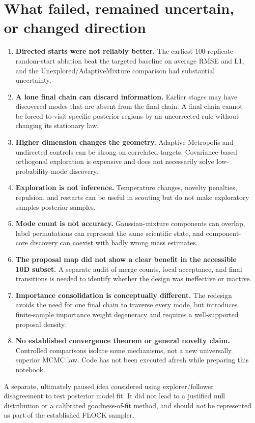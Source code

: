 \documentclass[11pt,letterpaper]{article}
\begin{document}
\section{What failed, remained uncertain, or changed direction}
\begin{enumerate}[leftmargin=*]
\item \textbf{Directed starts were not reliably better.} The earliest 100-replicate random-start ablation beat the targeted baseline on average RMSE and L1, and the Unexplored/AdaptiveMixture comparison had substantial uncertainty.
\item \textbf{A lone final chain can discard information.} Earlier stages may have discovered modes that are absent from the final chain. A final chain cannot be forced to visit specific posterior regions by an uncorrected rule without changing its stationary law.
\item \textbf{Higher dimension changes the geometry.} Adaptive Metropolis and undirected controls can be strong on correlated targets. Covariance-based orthogonal exploration is expensive and does not necessarily solve low-probability-mode discovery.
\item \textbf{Exploration is not inference.} Temperature changes, novelty penalties, repulsion, and restarts can be useful in scouting but do not make exploratory samples posterior samples.
\item \textbf{Mode count is not accuracy.} Gaussian-mixture components can overlap, label permutations can represent the same scientific state, and component-core discovery can coexist with badly wrong mass estimates.
\item \textbf{The proposal map did not show a clear benefit in the accessible 10D subset.} A separate audit of merge counts, local acceptance, and final transitions is needed to identify whether the design was ineffective or inactive.
\item \textbf{Importance consolidation is conceptually different.} The redesign avoids the need for one final chain to traverse every mode, but introduces finite-sample importance weight degeneracy and requires a well-supported proposal density.
\item \textbf{No established convergence theorem or general novelty claim.} Controlled comparisons isolate some mechanisms, not a new universally superior MCMC law. Code has not been executed afresh while preparing this notebook.
\end{enumerate}
A separate, ultimately paused idea considered using explorer/follower disagreement to test posterior model fit. It did not lead to a justified null distribution or a calibrated goodness-of-fit method, and should \emph{not} be represented as part of the established FLOCK sampler.
\end{document}
